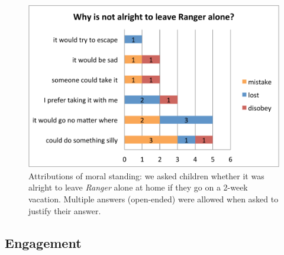 \documentclass[letterpaper, 10pt, conference]{ieeeconf}
\begin{document}
\begin{figure}[!h]
    \centering 
    \includegraphics[width=1.0\linewidth]{domino-leave-why.pdf}
    \caption{\small Attributions of moral
        standing: we asked children whether it was alright to leave \emph{Ranger}
        alone at home if they go on a 2-week vacation. Multiple answers
        (open-ended) were allowed when asked to justify their answer.}

    \label{fig:domino-leave-alone} 
\end{figure}

\subsection{Engagement}
\label{engagement}

%
%
\end{document}
